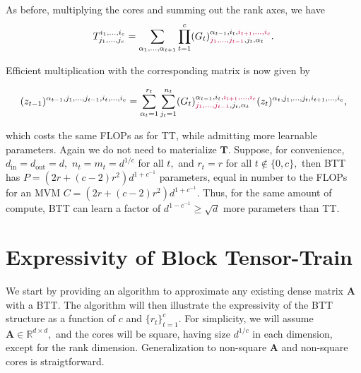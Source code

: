 \documentclass{article}
\newcommand{\mbf}[1]{{\boldsymbol{\mathbf{#1}}}}
\newcommand{\bm}{\mbf}
\theoremstyle{plain}
\theoremstyle{definition}
\theoremstyle{remark}
\newcommand{\tc}[1]{\textcolor{purple}{#1}}
\newcommand{\R}{\mathbb{R}}
\newcommand{\din}{{d_\mathrm{in}}}
\newcommand{\dout}{{d_\mathrm{out}}}
\begin{document}
As before, multiplying the cores and summing out the rank axes, we have
\begin{equation}
    T^{i_1, \ldots, i_c}_{j_1, \ldots, j_c} = \sum_{\alpha_1, \ldots, \alpha_{t+1}} \prod_{t=1}^{c} (G_t)^{\alpha_{t-1}, i_t, \tc{i_{t+1}, \ldots, i_c}}_{\tc{j_1, \ldots, j_{t-1}}, j_t, \alpha_{t}}.
\end{equation}

Efficient multiplication with the corresponding matrix is now given by

\begin{equation}
    \begin{split}
      (z_{t-1})^{\alpha_{t-1}, j_1, \ldots, j_{t-1}, i_t, \ldots, i_c} = \sum_{\alpha_t=1}^{r_t}  \sum_{j_t=1}^{n_t} (G_t)^{\alpha_{t-1}, i_t, \tc{i_{t+1}, \ldots, i_c}}_{\tc{j_1, \ldots, j_{t-1}}, j_t, \alpha_{t}} (z_t)^{\alpha_t, j_1, \ldots, j_t, i_{t+1}, \ldots, i_c},
    \end{split}
\end{equation}


which costs the same FLOPs as for TT, while admitting more learnable parameters. Again we do not need to materialize $\bm{T}.$ Suppose, for convenience, $\din=\dout=d,$ $n_t = m_t = d^{1/c}$ for all $t,$ and $r_t = r$ for all $t \notin \{0, c\},$ then BTT has $P=(2r + (c-2) r^2) d^{1+c^{-1}}$ parameters, equal in number to the FLOPs for an MVM $C=(2r + (c-2) r^2) d^{1+c^{-1}}$. Thus, for the same amount of compute, BTT can learn a factor of $d^{1 - c^{-1}} \geq \sqrt{d}$ more parameters than TT.

\section{Expressivity of Block Tensor-Train}
We start by providing an algorithm to approximate any existing dense matrix $\bm{A}$ with a BTT. The algorithm will then illustrate the expressivity of the BTT structure as a function of $c$ and $\{r_t\}_{t=1}^{c}$. For simplicity, we will assume $\bm{A} \in \R^{d \times d},$ and the cores will be square, having size $d^{1/c}$ in each dimension, except for the rank dimension. Generalization to non-square $\bm{A}$ and non-square cores is straigtforward.
\end{document}
